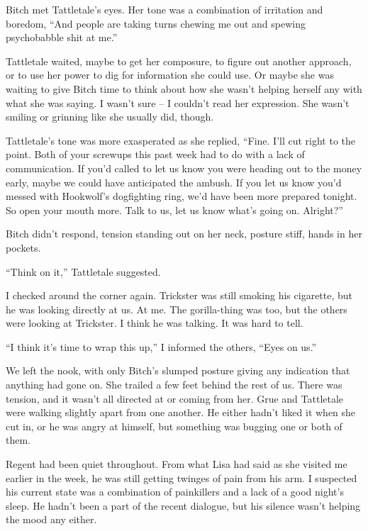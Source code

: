 Bitch met Tattletale's eyes.  Her tone was a combination of irritation and boredom, ``And people are taking turns chewing me out and spewing psychobabble shit at me.''



Tattletale waited, maybe to get her composure, to figure out another approach, or to use her power to dig for information she could use.  Or maybe she was waiting to give Bitch time to think about how she wasn't helping herself any with what she was saying.  I wasn't sure – I couldn't read her expression.  She wasn't smiling or grinning like she usually did, though.



Tattletale's tone was more exasperated as she replied, ``Fine.  I'll cut right to the point.  Both of your screwups this past week had to do with a lack of communication.  If you'd called to let us know you were heading out to the money early, maybe we could have anticipated the ambush.  If you let us know you'd messed with Hookwolf's dogfighting ring, we'd have been more prepared tonight.  So open your mouth more.  Talk to us, let us know what's going on.  Alright?''



Bitch didn't respond, tension standing out on her neck, posture stiff, hands in her pockets.



``Think on it,'' Tattletale suggested.



I checked around the corner again.  Trickster was still smoking his cigarette, but he was looking directly at us.  At me.  The gorilla-thing was too, but the others were looking at Trickster.  I think he was talking.  It was hard to tell.



``I think it's time to wrap this up,'' I informed the others, ``Eyes on us.''



We left the nook, with only Bitch's slumped posture giving any indication that anything had gone on.  She trailed a few feet behind the rest of us.  There was tension, and it wasn't all directed at or coming from her.  Grue and Tattletale were walking slightly apart from one another.  He either hadn't liked it when she cut in, or he was angry at himself, but something was bugging one or both of them.



Regent had been quiet throughout.  From what Lisa had said as she visited me earlier in the week, he was still getting twinges of pain from his arm.  I suspected his current state was a combination of painkillers and a lack of a good night's sleep.  He hadn't been a part of the recent dialogue, but his silence wasn't helping the mood any either.



